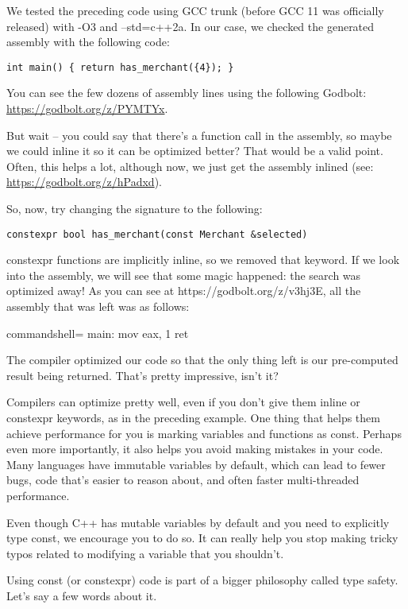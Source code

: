 We tested the preceding code using GCC trunk (before GCC 11 was officially released) with -O3 and --std=c++2a. In our case, we checked the generated assembly with the following code:

\begin{lstlisting}[style=styleCXX]
int main() { return has_merchant({4}); }
\end{lstlisting}

You can see the few dozens of assembly lines using the following Godbolt: \url{https://godbolt.org/z/PYMTYx}.

But wait – you could say that there's a function call in the assembly, so maybe we could inline it so it can be optimized better? That would be a valid point. Often, this helps a lot, although now, we just get the assembly inlined (see: \url{https://godbolt.org/z/hPadxd}).

So, now, try changing the signature to the following:

\begin{lstlisting}[style=styleCXX]
constexpr bool has_merchant(const Merchant &selected)
\end{lstlisting}

constexpr functions are implicitly inline, so we removed that keyword. If we look into the assembly, we will see that some magic happened: the search was optimized away! As you can see at https://godbolt.org/z/v3hj3E, all the assembly that was left was as follows:

\begin{tcblisting}{commandshell={}}
main:
    mov eax, 1
    ret
\end{tcblisting}

The compiler optimized our code so that the only thing left is our pre-computed result being returned. That's pretty impressive, isn't it?


Compilers can optimize pretty well, even if you don't give them inline or constexpr keywords, as in the preceding example. One thing that helps them achieve performance for you is marking variables and functions as const. Perhaps even more importantly, it also helps you avoid making mistakes in your code. Many languages have immutable variables by default, which can lead to fewer bugs, code that's easier to reason about, and often faster multi-threaded performance.

Even though C++ has mutable variables by default and you need to explicitly type const, we encourage you to do so. It can really help you stop making tricky typos related to modifying a variable that you shouldn't.

Using const (or constexpr) code is part of a bigger philosophy called type safety. Let's say a few words about it.











